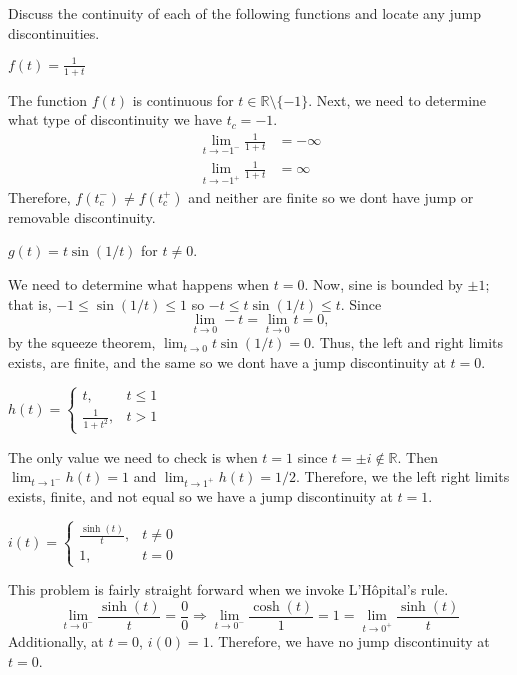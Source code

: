 Discuss the continuity of each of the following functions and locate any jump
discontinuities.
\begin{exercise}
\item
  \(f(t) = \frac{1}{1 + t}\)
  \par\smallskip
  The function \(f(t)\) is continuous for \(t\in\mathbb{R}\setminus\{-1\}\).
  Next, we need to determine what type of discontinuity we have \(t_c = -1\).
  \begin{align*}
    \lim_{t\to -1^-}\frac{1}{1 + t} & = -\infty\\
    \lim_{t\to -1^+}\frac{1}{1 + t} & = \infty
  \end{align*}
  Therefore, \(f(t_c^-)\neq f(t_c^+)\) and neither are finite so we dont have
  jump or removable discontinuity.
\item
  \(g(t) = t\sin(1/t)\) for \(t\neq 0\).
  \par\smallskip
  We need to determine what happens when \(t = 0\).
  Now, sine is bounded by \(\pm 1\); that is, \(-1\leq\sin(1/t)\leq 1\) so
  \(-t\leq t\sin(1/t)\leq t\).
  Since
  \[
  \lim_{t\to 0}-t = \lim_{t\to 0}t = 0,
  \]
  by the squeeze theorem, \(\lim_{t\to 0}t\sin(1/t) = 0\).
  Thus, the left and right limits exists, are finite, and the same so we
  dont have a jump discontinuity at \(t = 0\).
\item
  \(h(t) =
  \begin{cases}
    t, & t\leq 1\\
    \frac{1}{1 + t^2}, & t > 1
  \end{cases}\)
  \par\smallskip
  The only value we need to check is when \(t = 1\) since
  \(t = \pm i\not\in\mathbb{R}\).
  Then \(\lim_{t\to 1^-}h(t) = 1\) and \(\lim_{t\to 1^+}h(t) = 1/2\).
  Therefore, we the left right limits exists, finite, and not equal so we have
  a jump discontinuity at \(t = 1\).
\item
  \(i(t) =
  \begin{cases}
    \frac{\sinh(t)}{t}, & t\neq 0\\
    1, & t = 0
  \end{cases}\)
  \par\smallskip
  This problem is fairly straight forward when we invoke L'H\^{o}pital's rule.
  \[
  \lim_{t\to 0^-}\frac{\sinh(t)}{t} = \frac{0}{0}\Rightarrow
  \lim_{t\to 0^-}\frac{\cosh(t)}{1} = 1 =
  \lim_{t\to 0^+}\frac{\sinh(t)}{t}
  \]
  Additionally, at \(t = 0\), \(i(0) = 1\).
  Therefore, we have no jump discontinuity at \(t = 0\).
\item

\end{exercise}
